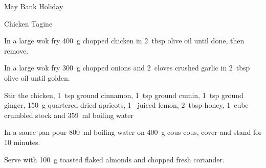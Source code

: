 \begin{menu}{May Bank Holiday}
\begin{recipe}{2}{Chicken Tagine}
    \begin{instructions}
    \item 
        In a large wok fry
        400~g chopped chicken
        in
        2~tbsp  olive oil
        until done, then remove.
      \item 
        In a large wok fry
        300~g chopped onions
        and
        2~cloves crushed garlic
        in
        2~tbsp  olive oil
        until golden.
      \item 
        Stir the chicken,
        1~tsp  ground cinnamon,
        1~tsp  ground cumin,
        1~tsp  ground ginger,
        150~g quartered dried apricots,
        1~ juiced lemon,
        2~tbsp  honey,
        1~cube crumbled stock
        and
        359~ml  boiling water\item 
      In a
      sauce pan pour 800~ml  boiling water
      on 400~g  cous cous, cover and
      stand for 10 minutes.
    \item 
        Serve with
        100~g toasted flaked almonds
        and
         chopped fresh coriander.
      
    \end{instructions}
    \end{recipe}%
  
    \clearpage
    \end{menu}
	
	